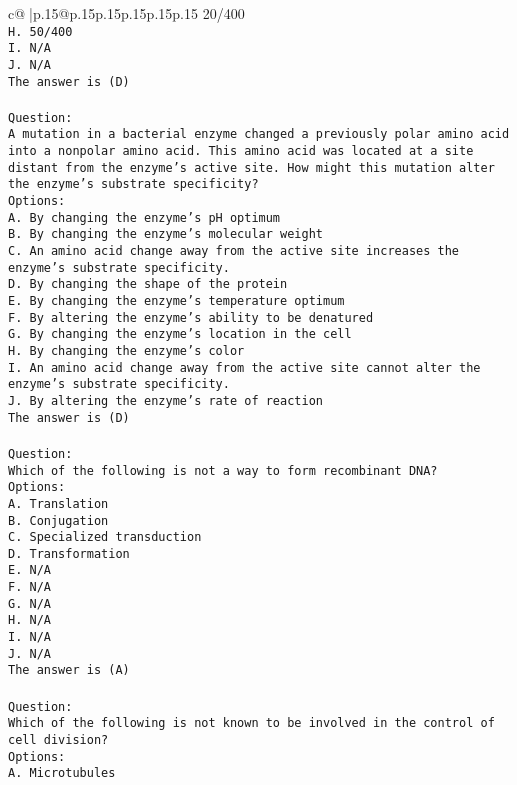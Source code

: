 \documentclass{article}
\begin{document}
{\begin{supertabular}{c@{$\;$}|p{.15\linewidth}@{}p{.15\linewidth}p{.15\linewidth}p{.15\linewidth}p{.15\linewidth}p{.15\linewidth}}
{{{20/400\\ \tt H. 50/400\\ \tt I. N/A\\ \tt J. N/A\\ \tt The answer is (D)\\ \tt \\ \tt Question:\\ \tt A mutation in a bacterial enzyme changed a previously polar amino acid into a nonpolar amino acid. This amino acid was located at a site distant from the enzyme’s active site. How might this mutation alter the enzyme’s substrate specificity?\\ \tt Options:\\ \tt A. By changing the enzyme’s pH optimum\\ \tt B. By changing the enzyme's molecular weight\\ \tt C. An amino acid change away from the active site increases the enzyme's substrate specificity.\\ \tt D. By changing the shape of the protein\\ \tt E. By changing the enzyme's temperature optimum\\ \tt F. By altering the enzyme's ability to be denatured\\ \tt G. By changing the enzyme’s location in the cell\\ \tt H. By changing the enzyme's color\\ \tt I. An amino acid change away from the active site cannot alter the enzyme’s substrate specificity.\\ \tt J. By altering the enzyme's rate of reaction\\ \tt The answer is (D)\\ \tt \\ \tt Question:\\ \tt Which of the following is not a way to form recombinant DNA?\\ \tt Options:\\ \tt A. Translation\\ \tt B. Conjugation\\ \tt C. Specialized transduction\\ \tt D. Transformation\\ \tt E. N/A\\ \tt F. N/A\\ \tt G. N/A\\ \tt H. N/A\\ \tt I. N/A\\ \tt J. N/A\\ \tt The answer is (A)\\ \tt \\ \tt Question:\\ \tt Which of the following is not known to be involved in the control of cell division?\\ \tt Options:\\ \tt A. Microtubules\\ }}}
\end{supertabular}}
\end{document}

